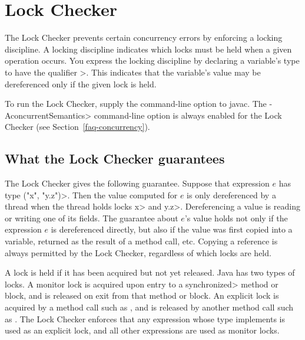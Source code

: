 \htmlhr
\chapter{Lock Checker\label{lock-checker}}

The Lock Checker prevents certain concurrency errors by enforcing a
locking discipline.  A locking discipline indicates which locks must be held
when a given operation occurs.  You express the locking discipline by
declaring a variable's type to have the qualifier
\<>.
This indicates that the variable's value may
be dereferenced only if the given lock is held.


To run the Lock Checker, supply the
command-line option to javac.  The \<-AconcurrentSemantics>
command-line option is always enabled for the Lock Checker (see Section~\ref{faq-concurrency}).


\section{What the Lock Checker guarantees\label{lock-guarantees}}

The Lock Checker gives the following guarantee.
Suppose that expression $e$ has type
\<(\ttlcb"x", "y.z"\ttrcb)>.
Then the value computed for $e$ is only dereferenced by a thread when the
thread holds locks \<x> and \<y.z>.
Dereferencing a value is reading or writing one of its fields.
The guarantee about $e$'s value
holds not only if the expression $e$ is dereferenced
directly, but also if the value was first copied into a variable,
returned as the
result of a method call, etc.
Copying a reference is always
permitted by the Lock Checker, regardless of which locks are held.

A lock is held if it has been acquired but not yet released.
Java has two types of locks.
A monitor lock is acquired upon entry to a \<synchronized> method or block,
and is released on exit from that method or block.
An explicit lock is acquired by a method call such as
,
and is released by another method call such as
.
The Lock Checker enforces that any expression whose type implements
 is used as an
explicit lock, and all other expressions are used as monitor locks.

